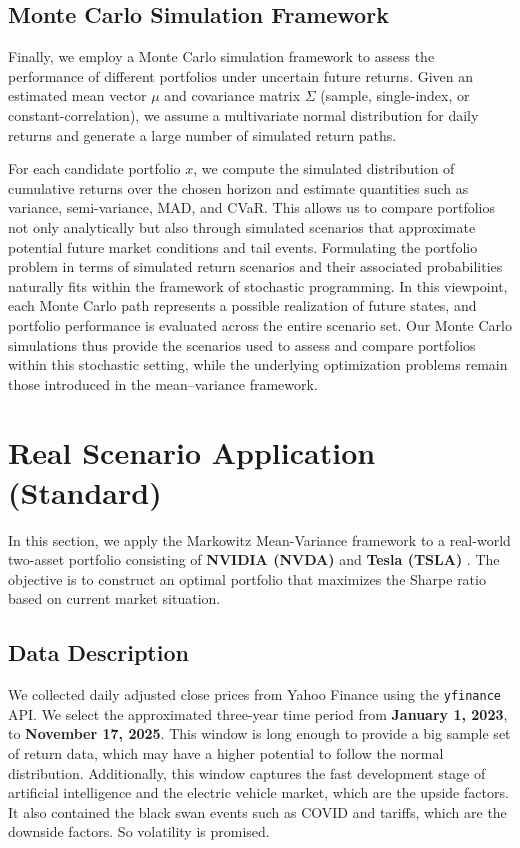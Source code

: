 \documentclass[12pt]{article}
\begin{document}
\subsection{Monte Carlo Simulation Framework}

Finally, we employ a Monte Carlo simulation framework to assess the performance of different portfolios under uncertain future returns. Given an estimated mean vector $\mu$ and covariance matrix $\Sigma$ (sample, single-index, or constant-correlation), we assume a multivariate normal distribution for daily returns and generate a large number of simulated return paths.

For each candidate portfolio $x$, we compute the simulated distribution of cumulative returns over the chosen horizon and estimate quantities such as variance, semi-variance, MAD, and CVaR. This allows us to compare portfolios not only analytically but also through simulated scenarios that approximate potential future market conditions and tail events. Formulating the portfolio problem in terms of simulated return scenarios and their associated probabilities naturally fits within the framework of stochastic programming. In this viewpoint, each Monte Carlo path represents a possible realization of future states, and portfolio performance is evaluated across the entire scenario set. Our Monte Carlo simulations thus provide the scenarios used to assess and compare portfolios within this stochastic setting, while the underlying optimization problems remain those introduced in the mean--variance framework.


\section{Real Scenario Application (Standard)}


In this section, we apply the Markowitz Mean-Variance framework to a real-world two-asset portfolio consisting of \textbf{NVIDIA (NVDA)} \cite{yahoo_nvda} and \textbf{Tesla (TSLA)} \cite{yahoo_tsla}. The objective is to construct an optimal portfolio that maximizes the Sharpe ratio based on current market situation.

\subsection{Data Description}
We collected daily adjusted close prices from Yahoo Finance using the \texttt{yfinance} API. We select the approximated three-year time period from \textbf{January 1, 2023}, to \textbf{November 17, 2025}. This window is long enough to provide a big sample set of return data, which may have a higher potential to follow the normal distribution. Additionally, this window captures the fast development stage of artificial intelligence and the electric vehicle market, which are the upside factors. It also contained the black swan events such as COVID and tariffs, which are the downside factors. So volatility is promised.
\end{document}
